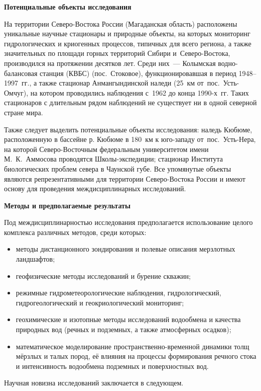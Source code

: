 

\textbf{Потенциальные объекты исследования}

На территории Северо-Востока России (Магаданская область) расположены уникальные научные стационары и природные объекты, на которых мониторинг гидрологических и криогенных процессов, типичных для всего региона, а также значительных по площади горных территорий Сибири и~Северо-Востока, производился на протяжении десятков лет. Среди них~--- Колымская водно-балансовая станция (КВБС) (пос.~Стоковое), функционировавшая в период 1948--1997~гг., а также стационар Анмангындинской наледи (25~км от~пос.~Усть-Омчуг), на котором проводились наблюдения с~1962 до конца 1990-х~гг. Таких стационаров с длительным рядом наблюдений не существует ни в одной северной стране мира.

Также следует выделить потенциальные объекты исследования: наледь Кюбюме, расположенную в бассейне р. Кюбюме в 180~км к юго-западу от~пос.~Усть-Нера, на которой Северо-Восточным федеральным университетом имени М.~К.~Аммосова проводятся Школы-экспедиции; стационар Института биологических проблем севера в Чаунской губе. Все упомянутые объекты являются репрезентативными для территории Северо-Востока России и имеют основу для проведения междисциплинарных исследований.

\textbf{Методы и предполагаемые результаты}

Под междисциплинарностью исследования предполагается использование целого комплекса различных методов, среди которых:
\begin{itemize}[noitemsep]\vspace{-8pt}
  \item методы дистанционного зондирования и полевые описания мерзлотных ландшафтов;
  \item геофизические методы исследований и бурение скважин;
  \item режимные гидрометеорологические наблюдения, гидрологический, гидрогеологический и геокриологический мониторинг;
  \item геохимические и изотопные методы исследований водообмена и качества природных вод (речных и подземных, а также атмосферных осадков);
  \item математическое моделирование пространственно-временной динамики толщ мёрзлых и талых пород, её влияния на процессы формирования речного стока и интенсивность водообмена подземных и поверхностных вод.
\end{itemize}
 \vspace{-8pt}
Научная новизна исследований заключается в следующем.

